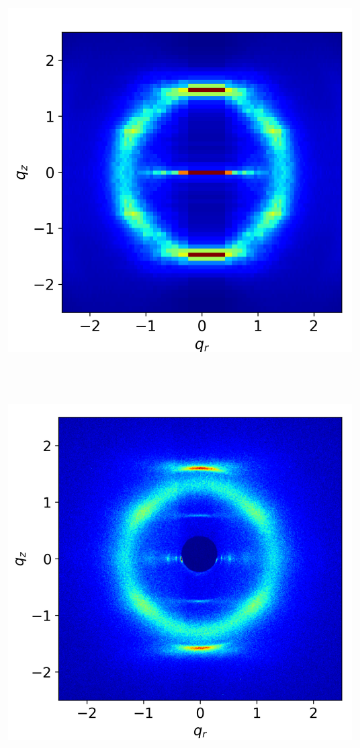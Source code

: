 \documentclass{article}
\begin{document}
  \begin{figure}
  \begin{subfigure}{0.3\linewidth}
        \centering
        \vspace{-0.2em}
        \includegraphics[width=1.018\linewidth]{layered_rzplot.png}
        \caption{}~\label{fig:rz_layered}
  \end{subfigure}
  \begin{subfigure}{0.3\linewidth}
        \centering
        \vspace{0.25em}
        \includegraphics[scale=0.0987]{WAXS_raw.png}

\end{subfigure}
\end{figure}
\end{document}
